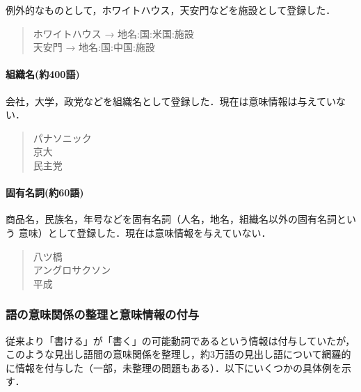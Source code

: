 \documentclass[a4j,titlepage]{jarticle}
\begin{document}
例外的なものとして，ホワイトハウス，天安門などを施設として登録した．

\begin{quote}
ホワイトハウス → 地名:国:米国:施設 \\
天安門 → 地名:国:中国:施設 \\
\end{quote}

\paragraph{組織名(約400語)}

会社，大学，政党などを組織名として登録した．現在は意味情報は与えていない．

\begin{quote}
パナソニック \\
京大 \\
民主党 \\
\end{quote}


\paragraph{固有名詞(約60語)}

商品名，民族名，年号などを固有名詞（人名，地名，組織名以外の固有名詞という
意味）として登録した．現在は意味情報を与えていない．

\begin{quote}
八ツ橋 \\
アングロサクソン \\
平成 \\
\end{quote}


\subsubsection{語の意味関係の整理と意味情報の付与}

従来より「書ける」が「書く」の可能動詞であるという情報は付与していたが，
このような見出し語間の意味関係を整理し，約3万語の見出し語について網羅的
に情報を付与した（一部，未整理の問題もある）．以下にいくつかの具体例を示す．
\end{document}
